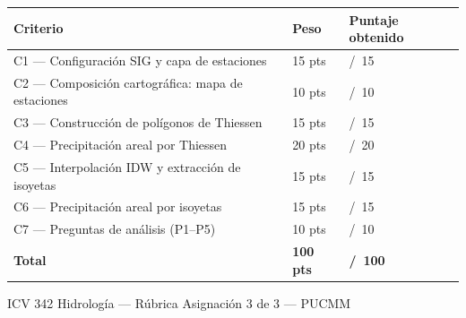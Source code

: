 \documentclass[11pt]{article}
\begin{document}
\begin{tabularx}{\textwidth}{%
    >{\raggedright\arraybackslash}X
    >{\centering\arraybackslash}p{2.0cm}
    >{\centering\arraybackslash}p{2.6cm}}
\toprule
\rowcolor{olive}
{\color{white}\bfseries Criterio}&
{\color{white}\bfseries Peso}&
{\color{white}\bfseries Puntaje obtenido}\\
\midrule
C1 --- Configuración SIG y capa de estaciones & \num{15} pts & \quad/~15 \\
C2 --- Composición cartográfica: mapa de estaciones & \num{10} pts & \quad/~10 \\
C3 --- Construcción de polígonos de Thiessen & \num{15} pts & \quad/~15 \\
C4 --- Precipitación areal por Thiessen & \num{20} pts & \quad/~20 \\
C5 --- Interpolación IDW y extracción de isoyetas & \num{15} pts & \quad/~15 \\
C6 --- Precipitación areal por isoyetas & \num{15} pts & \quad/~15 \\
C7 --- Preguntas de análisis (P1--P5) & \num{10} pts & \quad/~10 \\
\midrule
\rowcolor{lightgrey}
\bfseries Total & \bfseries\num{100} pts & \bfseries\quad/~100 \\
\bottomrule
\end{tabularx}

\vspace{1em}
\begin{tcolorbox}[enhanced, colback=white, colframe=midgrey,
  boxrule=0.5pt, arc=2pt, left=6pt, right=6pt, top=6pt, bottom=52pt,
  title=\textbf{Comentarios generales},
  fonttitle=\small\bfseries\color{darkblue},
  attach boxed title to top left={yshift=-2mm,xshift=4mm},
  boxed title style={colback=white,colframe=midgrey}]
\end{tcolorbox}

\vfill
\begin{center}
  {\small\color{midgrey}
    ICV 342 Hidrología --- Rúbrica Asignación 3 de 3 --- PUCMM}
\end{center}
\end{document}

